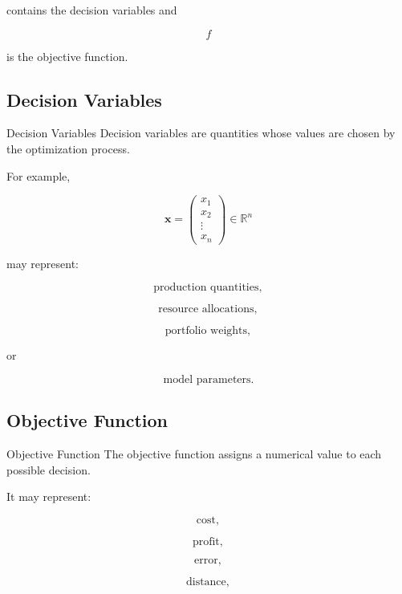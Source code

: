 contains the decision variables and

\[
f
\]

is the objective function.

\subsection{Decision Variables}
\label{subsec:decision-variables}

\begin{definitionbox}{Decision Variables}
Decision variables are quantities whose values are chosen by the
optimization process.
\end{definitionbox}

For example,

\[
\mathbf{x}
=
\begin{pmatrix}
x_1\\
x_2\\
\vdots\\
x_n
\end{pmatrix}
\in\mathbb{R}^n
\]

may represent:

\[
\boxed{
\text{production quantities},
}
\]

\[
\boxed{
\text{resource allocations},
}
\]

\[
\boxed{
\text{portfolio weights},
}
\]

or

\[
\boxed{
\text{model parameters}.
}
\]

\subsection{Objective Function}
\label{subsec:objective-function}

\begin{definitionbox}{Objective Function}
The objective function assigns a numerical value to each possible
decision.
\end{definitionbox}

It may represent:

\[
\boxed{
\text{cost},
}
\]

\[
\boxed{
\text{profit},
}
\]

\[
\boxed{
\text{error},
}
\]

\[
\boxed{
\text{distance},
}
\]

